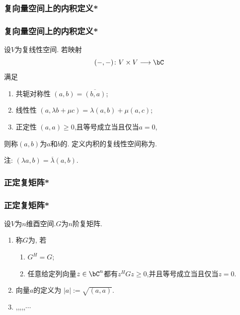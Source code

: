 \subsubsection{复向量空间上的内积定义*}
\begin{frame}\frametitle{复向量空间上的内积定义*}
\pp
\begin{definition}[酉空间]
设$V$为复线性空间.
\pp
若映射
\[(-,-)\colon V\times V\longrightarrow \bC\]
满足
\pp
\begin{enumerate}
\item 共轭对称性 $(a,b)=\overline{(b,a)}$;
\pp
\item 线性性 $(a,\lambda b + \mu c)=\lambda(a,b)+\mu(a,c)$;
\pp
\item 正定性 $(a,a)\geq0$,且等号成立当且仅当$a=0$,
\end{enumerate}
\pp
则称$(a,b)$为$a$和$b$的.
\pp
定义内积的复线性空间称为.
\end{definition}
\pp
注: $(\lambda a,b)=\overline{\lambda}(a,b)$.
\end{frame}





\subsubsection{正定复矩阵*}
\begin{frame}\frametitle{正定复矩阵*}
\begin{definition}设$V$为$n$维酉空间.$G$为$n$阶复矩阵.
\pp
\begin{enumerate}
\item 称$G$为,
\pp
若
\begin{enumerate}
\item $G^H=G$;
\pp
\item 任意给定列向量$z\in\bC^n$都有$z^HGz\geq0$,并且等号成立当且仅当$z=0$.
\end{enumerate}
\pp
\item 向量$a$的定义为 $|a|:=\sqrt{(a,a)}$.
\pp
\item {},,,,,$\cdots$
\end{enumerate}
\end{definition}
\end{frame}





